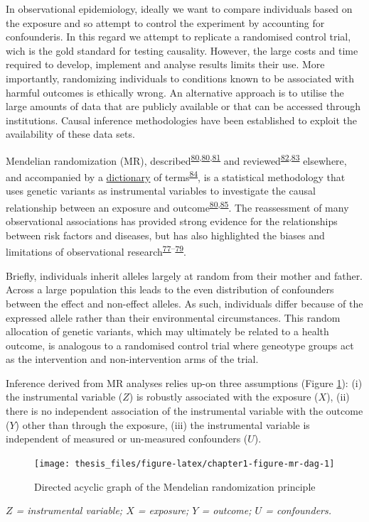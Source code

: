 \documentclass[11pt,twoside]{bristolthesis}
\newcommand{\bsmall}{\begin{small}}
\newcommand{\esmall}{\end{small}}
\begin{document}
In observational epidemiology, ideally we want to compare individuals based on the exposure and so attempt to control the experiment by accounting for confounderis. In this regard we attempt to replicate a randomised control trial, wich is the gold standard for testing causality. However, the large costs and time required to develop, implement and analyse results limits their use. More importantly, randomizing individuals to conditions known to be associated with harmful outcomes is ethically wrong. An alternative approach is to utilise the large amounts of data that are publicly available or that can be accessed through institutions. Causal inference methodologies have been established to exploit the availability of these data sets.

Mendelian randomization (MR), described\textsuperscript{\protect\hyperlink{ref-DaveySmith2003}{80},\protect\hyperlink{ref-DaveySmith2003}{80},\protect\hyperlink{ref-Davies2018}{81}} and reviewed\textsuperscript{\protect\hyperlink{ref-Burgess2015}{82},\protect\hyperlink{ref-Bowden2019}{83}} elsewhere, and accompanied by a \href{https://doi.org/10.31219/osf.io/6yzs7}{dictionary} of terms\textsuperscript{\protect\hyperlink{ref-Lawlor2019}{84}}, is a statistical methodology that uses genetic variants as instrumental variables to investigate the causal relationship between an exposure and outcome\textsuperscript{\protect\hyperlink{ref-DaveySmith2003}{80},\protect\hyperlink{ref-Smith2004}{85}}. The reassessment of many observational associations has provided strong evidence for the relationships between risk factors and diseases, but has also highlighted the biases and limitations of observational research\textsuperscript{\protect\hyperlink{ref-Timpson2005}{77}--\protect\hyperlink{ref-Yarmolinsky2018}{79}}.

Briefly, individuals inherit alleles largely at random from their mother and father. Across a large population this leads to the even distribution of confounders between the effect and non-effect alleles. As such, individuals differ because of the expressed allele rather than their environmental circumstances. This random allocation of genetic variants, which may ultimately be related to a health outcome, is analogous to a randomised control trial where geneotype groups act as the intervention and non-intervention arms of the trial.

Inference derived from MR analyses relies up-on three assumptions (Figure \ref{fig:chapter1-figure-mr-dag}): (i) the instrumental variable (\(Z\)) is robustly associated with the exposure (\(X\)), (ii) there is no independent association of the instrumental variable with the outcome (\(Y\)) other than through the exposure, (iii) the instrumental variable is independent of measured or un-measured confounders (\(U\)).
\begin{figure}
\texttt{[image: thesis\_files/figure-latex/chapter1-figure-mr-dag-1]} \caption{Directed acyclic graph of the Mendelian randomization principle}\label{fig:chapter1-figure-mr-dag}
\end{figure}
\noindent
\bsmall
\emph{\(Z\) = instrumental variable; \(X\) = exposure; \(Y\) = outcome; \(U\) = confounders.}
\esmall
\end{document}
